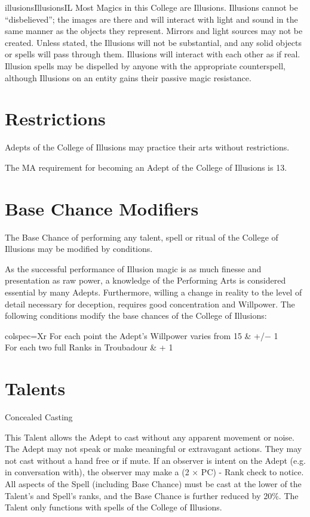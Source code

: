 \begin{College}[1.5]{illusions}{Illusions}{IL}
Most Magics in this College are Illusions. Illusions cannot be
“disbelieved”; the images are there and will interact with light and
sound in the same manner as the objects they represent. Mirrors and
light sources may not be created.  Unless stated, the Illusions will
not be substantial, and any solid objects or spells will pass through
them.  Illusions will interact with each other as if real.  Illusion
spells may be dispelled by anyone with the appropriate counterspell,
although Illusions on an entity gains their passive magic resistance.

\section{Restrictions}

Adepts of the College of Illusions may practice their arts without
restrictions.

The MA requirement for becoming an Adept of the College of Illusions
is 13.

\section{Base Chance Modifiers}

The Base Chance of performing any talent, spell or ritual of the
College of Illusions may be modified by conditions.

As the successful performance of Illusion magic is as much finesse and
presentation as raw power, a knowledge of the Performing Arts is
considered essential by many Adepts.  Furthermore, willing a change in
reality to the level of detail necessary for deception, requires good
concentration and Willpower.  The following conditions modify the
base chances of the College of Illusions:

\begin{dqtblr}{colspec={Xr}}
For each point the Adept’s Willpower varies from 15	&  +/− 1 \\
For each two full Ranks in Troubadour			& + 1 \\
\end{dqtblr}

\section{Talents}

\begin{talent}[T-1]{Concealed Casting}

\begin{effects}
This Talent allows the Adept to cast without any apparent movement or
noise.  The Adept may not speak or make meaningful or extravagant
actions. They may not cast without a hand free or if mute.  If an
observer is intent on the Adept (e.g. in conversation with), the
observer may make a (2 × PC) - Rank check to notice. All aspects of
the Spell (including Base Chance) must be cast at the lower of the
Talent’s and Spell’s ranks, and the Base Chance is further reduced by
20\%. The Talent only functions with spells of the College of
Illusions.
\end{effects}
\end{talent}


\end{College}
